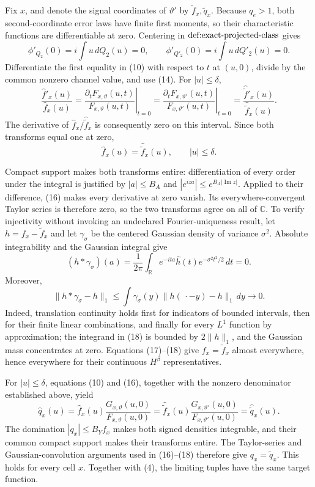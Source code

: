 Fix \(x\), and denote the signal coordinates of \(\vartheta'\) by
\(\widetilde f_x,\widetilde q_x\).  Because \(q_e>1\), both second-coordinate
error laws have finite first moments, so their characteristic functions are
differentiable at zero.  Centering in
\(\textnormal{def:exact-projected-class}\) gives
\[
 \phi'_{Q_2}(0)=i\int u\,dQ_2(u)=0,
 \qquad
 \phi'_{Q'_2}(0)=i\int u\,dQ'_2(u)=0.                             \tag{14}
\]
Differentiate the first equality in (10) with respect to \(t\) at
\((u,0)\), divide by the common nonzero channel value, and use (14).  For
\(|u|\le\delta\),
\[
 \frac{\widehat f'_x(u)}{\widehat f_x(u)}
 =\left.\frac{\partial_tF_{x,\vartheta}(u,t)}
 {F_{x,\vartheta}(u,t)}\right|_{t=0}
 =\left.\frac{\partial_tF_{x,\vartheta'}(u,t)}
 {F_{x,\vartheta'}(u,t)}\right|_{t=0}
 =\frac{\widehat{\widetilde f}'_x(u)}
        {\widehat{\widetilde f}_x(u)}.                            \tag{15}
\]
The derivative of
\(\widehat f_x/\widehat{\widetilde f}_x\) is consequently zero on this
interval.  Since both transforms equal one at zero,
\[
 \widehat f_x(u)=\widehat{\widetilde f}_x(u),
 \qquad |u|\le\delta.                                             \tag{16}
\]

Compact support makes both transforms entire: differentiation of every order
under the integral is justified by
\(|a|\le B_A\) and
\(|e^{iza}|\le e^{B_A|\operatorname{Im}z|}\).  Applied to their difference,
(16) makes every derivative at zero vanish.  Its everywhere-convergent Taylor
series is therefore zero, so the two transforms agree on all of \(\mathbb C\).
To verify injectivity without invoking an undeclared Fourier-uniqueness result,
let \(h=f_x-\widetilde f_x\) and let \(\gamma_\sigma\) be the centered
Gaussian density of variance \(\sigma^2\).  Absolute integrability and the
Gaussian integral give
\[
 (h*\gamma_\sigma)(a)
 =\frac{1}{2\pi}\int_{\mathbb R}e^{-ita}
   \widehat h(t)e^{-\sigma^2t^2/2}\,dt=0.                         \tag{17}
\]
Moreover,
\[
 \|h*\gamma_\sigma-h\|_1
 \le\int\gamma_\sigma(y)\|h(\,\cdot-y)-h\|_1\,dy
 \longrightarrow0.                                              \tag{18}
\]
Indeed, translation continuity holds first for indicators of bounded
intervals, then for their finite linear combinations, and finally for every
\(L^1\) function by approximation; the integrand in (18) is bounded by
\(2\|h\|_1\), and the Gaussian mass concentrates at zero.  Equations
(17)--(18) give \(f_x=\widetilde f_x\) almost everywhere, hence everywhere
for their continuous \(H^\beta\) representatives.

For \(|u|\le\delta\), equations (10) and (16), together with the nonzero
denominator established above, yield
\[
 \widehat q_x(u)
 =\widehat f_x(u)\frac{G_{x,\vartheta}(u,0)}{F_{x,\vartheta}(u,0)}
 =\widehat{\widetilde f}_x(u)
   \frac{G_{x,\vartheta'}(u,0)}{F_{x,\vartheta'}(u,0)}
 =\widehat{\widetilde q}_x(u).                                   \tag{19}
\]
The domination \(|q_x|\le B_Yf_x\) makes both signed densities integrable,
and their common compact support makes their transforms entire.  The
Taylor-series and Gaussian-convolution arguments used in (16)--(18) therefore
give \(q_x=\widetilde q_x\).  This holds for every cell \(x\).  Together with
(4), the limiting tuples have the same target function.

